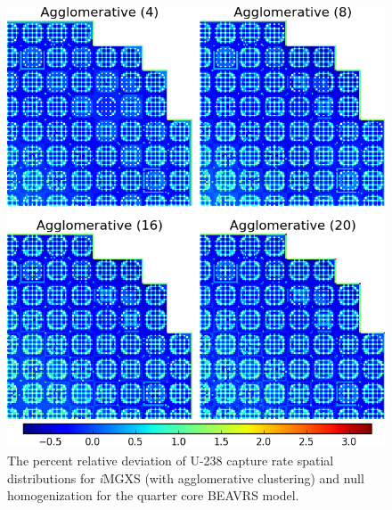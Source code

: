 \begin{figure}[h!]
\centering
\includegraphics[width=0.9\linewidth]{figures/results/compare/full-core/compare-capt-agglomerative}
\vspace{2mm}
\caption[U-238 capture rate \textit{i}MGXS-to-null relative deviations]{The percent relative deviation of U-238 capture rate spatial distributions for \textit{i}\ac{MGXS} (with agglomerative clustering) and null homogenization for the quarter core BEAVRS model.}
\label{fig:chap11-full-core-capt-rates-agglomerative-comp}
\end{figure}

\clearpage

